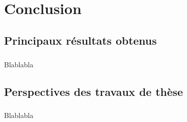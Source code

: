 \chapter{Conclusion}
\label{chap:conclu}
\newpage

\section{Principaux résultats obtenus}
	\paragraph{} Blablabla

\section{Perspectives des travaux de thèse}

	\paragraph{} Blablabla